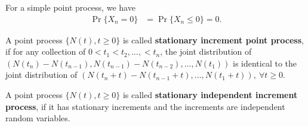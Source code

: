 \documentclass[a4paper,10pt,english]{article}
\begin{document}
\begin{rem} For a simple point process, we have
\begin{align*}
\Pr\{X_{n} = 0\} &= \Pr\{X_n\leqslant 0\} = 0.
\end{align*}
\end{rem}
\begin{defn} A point process $\{N(t), t\geqslant 0\}$ is called \textbf{stationary increment point process}, if for any collection of $0 < t_{1}<t_{2}, \ldots,<t_{n}$, the joint distribution of $(N(t_{n})-N(t_{n-1}),N(t_{n-1})-N(t_{n-2}),...,N(t_{1}))$ is identical to the joint distribution of $(N(t_{n}+t)-N(t_{n-1}+t),...,N(t_{1}+t)), ~ \forall t \geqslant 0$.
\end{defn}

\begin{defn} A point process $\{N(t), t\geqslant 0\}$ is called \textbf{stationary independent increment process}, if it has stationary increments and the increments are independent random variables.
\end{defn}
\end{document}
